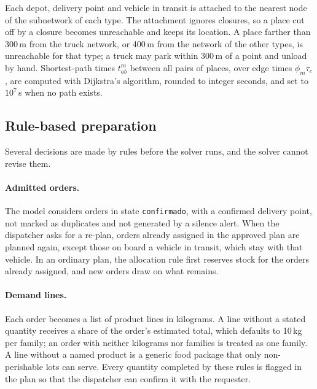 \documentclass[11pt]{article}
\newcommand{\code}[1]{\texttt{\small #1}}
\begin{document}
Each depot, delivery point and vehicle in transit is attached to the nearest node of the subnetwork of each type. The attachment ignores closures, so a place cut off by a closure becomes unreachable and keeps its location. A place farther than 300\,m from the truck network, or 400\,m from the network of the other types, is unreachable for that type; a truck may park within 300\,m of a point and unload by hand. Shortest-path times $t^m_{ab}$ between all pairs of places, over edge times $\phi_m\tau_e$, are computed with Dijkstra's algorithm, rounded to integer seconds, and set to $10^7$\,s when no path exists.

\subsection{Rule-based preparation}

Several decisions are made by rules before the solver runs, and the solver cannot revise them. %

\paragraph{Admitted orders.} The model considers orders in state \code{confirmado}, with a confirmed delivery point, not marked as duplicates and not generated by a silence alert. When the dispatcher asks for a re-plan, orders already assigned in the approved plan are planned again, except those on board a vehicle in transit, which stay with that vehicle. In an ordinary plan, the allocation rule first reserves stock for the orders already assigned, and new orders draw on what remains.

\paragraph{Demand lines.} Each order becomes a list of product lines in kilograms. A line without a stated quantity receives a share of the order's estimated total, which defaults to 10\,kg per family; an order with neither kilograms nor families is treated as one family. A line without a named product is a generic food package that only non-perishable lots can serve. Every quantity completed by these rules is flagged in the plan so that the dispatcher can confirm it with the requester.
\end{document}
